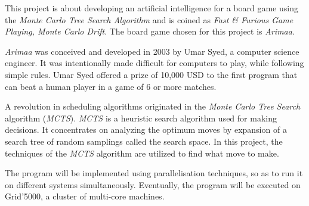 This project is about developing an artificial intelligence for a board game using the \emph{Monte Carlo Tree Search Algorithm} and is coined as \emph{Fast \& Furious Game Playing, Monte Carlo Drift}. The board game chosen for this project is \emph{Arimaa}.
\newline

\emph{Arimaa} was conceived and developed in 2003 by Umar Syed, a computer science engineer. It was intentionally made difficult for computers to play, while following simple rules. Umar Syed offered a prize of 10,000 USD to the first program that can beat a human player in a game of 6 or more matches.
\newline

A revolution in scheduling algorithms originated in the \emph{Monte Carlo Tree Search} algorithm (\emph{MCTS}). \emph{MCTS} is a heuristic search algorithm used for making decisions. It concentrates on analyzing the optimum moves by expansion of a search tree of random samplings called the search space. In this project, the techniques of the \emph{MCTS} algorithm are utilized to find what move to make.
\newline

The program will be implemented using parallelisation techniques, so as to run it on different systems simultaneously. Eventually, the program will be executed on Grid'5000, a cluster of multi-core machines.
